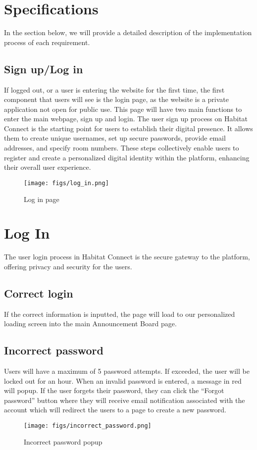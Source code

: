 \documentclass[conference]{IEEEtran}
\begin{document}
\section{Specifications}
In the section below, we will provide a detailed description of the implementation process of each requirement.
\subsection{Sign up/Log in}
If logged out, or a user is entering the website for the first time, the first component that users will see is the login page, as the website is a private application not open for public use. This page will have two main functions to enter the main webpage, sign up and login. The user sign up process on Habitat Connect is the starting point for users to establish their digital presence. It allows them to create unique usernames, set up secure passwords, provide email addresses, and specify room numbers. These steps collectively enable users to register and create a personalized digital identity within the platform, enhancing their overall user experience.
\begin{figure}[H]
\centering
\texttt{[image: figs/log\_in.png]}
\caption{Log in page}
\label{fig:Log in page}
\end{figure}
\section*{Log In}
The user login process in Habitat Connect is the secure gateway to the platform, offering privacy and security for the users.
\subsection*{Correct login}
If the correct information is inputted, the page will load to our personalized loading screen into the main Announcement Board page.
\subsection*{Incorrect password}
Users will have a maximum of 5 password attempts. If exceeded, the user will be locked out for an hour. When an invalid password is entered, a message in red will popup. If the user forgets their password, they can click the “Forgot password” button where they will receive email notification associated with the account which will redirect the users to a page to create a new password.
\begin{figure}[H]
\centering
\texttt{[image: figs/incorrect\_password.png]}
\caption{Incorrect password popup}
\label{fig:Incorrect password popup}
\end{figure}
\end{document}
